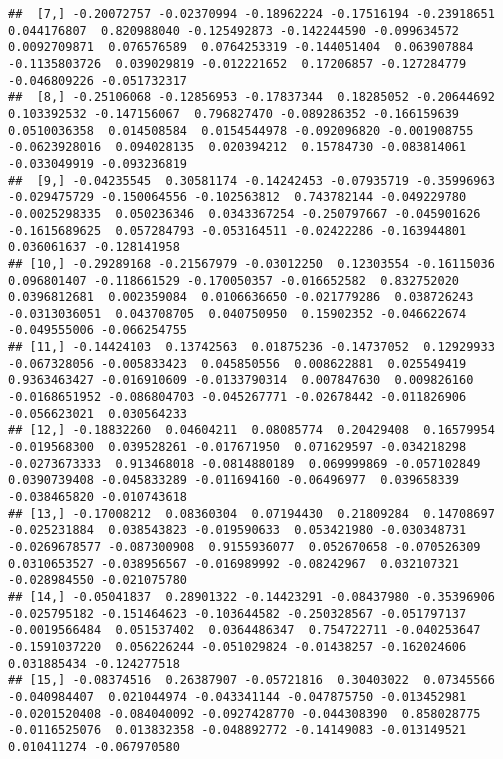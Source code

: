 \documentclass[
]{book}
\begin{document}
\begin{verbatim}
##  [7,] -0.20072757 -0.02370994 -0.18962224 -0.17516194 -0.23918651  0.044176807  0.820988040 -0.125492873 -0.142244590 -0.099634572  0.0092709871  0.076576589  0.0764253319 -0.144051404  0.063907884 -0.1135803726  0.039029819 -0.012221652  0.17206857 -0.127284779 -0.046809226 -0.051732317
##  [8,] -0.25106068 -0.12856953 -0.17837344  0.18285052 -0.20644692  0.103392532 -0.147156067  0.796827470 -0.089286352 -0.166159639  0.0510036358  0.014508584  0.0154544978 -0.092096820 -0.001908755 -0.0623928016  0.094028135  0.020394212  0.15784730 -0.083814061 -0.033049919 -0.093236819
##  [9,] -0.04235545  0.30581174 -0.14242453 -0.07935719 -0.35996963 -0.029475729 -0.150064556 -0.102563812  0.743782144 -0.049229780 -0.0025298335  0.050236346  0.0343367254 -0.250797667 -0.045901626 -0.1615689625  0.057284793 -0.053164511 -0.02422286 -0.163944801  0.036061637 -0.128141958
## [10,] -0.29289168 -0.21567979 -0.03012250  0.12303554 -0.16115036  0.096801407 -0.118661529 -0.170050357 -0.016652582  0.832752020  0.0396812681  0.002359084  0.0106636650 -0.021779286  0.038726243 -0.0313036051  0.043708705  0.040750950  0.15902352 -0.046622674 -0.049555006 -0.066254755
## [11,] -0.14424103  0.13742563  0.01875236 -0.14737052  0.12929933 -0.067328056 -0.005833423  0.045850556  0.008622881  0.025549419  0.9363463427 -0.016910609 -0.0133790314  0.007847630  0.009826160 -0.0168651952 -0.086804703 -0.045267771 -0.02678442 -0.011826906 -0.056623021  0.030564233
## [12,] -0.18832260  0.04604211  0.08085774  0.20429408  0.16579954 -0.019568300  0.039528261 -0.017671950  0.071629597 -0.034218298 -0.0273673333  0.913468018 -0.0814880189  0.069999869 -0.057102849  0.0390739408 -0.045833289 -0.011694160 -0.06496977  0.039658339 -0.038465820 -0.010743618
## [13,] -0.17008212  0.08360304  0.07194430  0.21809284  0.14708697 -0.025231884  0.038543823 -0.019590633  0.053421980 -0.030348731 -0.0269678577 -0.087300908  0.9155936077  0.052670658 -0.070526309  0.0310653527 -0.038956567 -0.016989992 -0.08242967  0.032107321 -0.028984550 -0.021075780
## [14,] -0.05041837  0.28901322 -0.14423291 -0.08437980 -0.35396906 -0.025795182 -0.151464623 -0.103644582 -0.250328567 -0.051797137 -0.0019566484  0.051537402  0.0364486347  0.754722711 -0.040253647 -0.1591037220  0.056226244 -0.051029824 -0.01438257 -0.162024606  0.031885434 -0.124277518
## [15,] -0.08374516  0.26387907 -0.05721816  0.30403022  0.07345566 -0.040984407  0.021044974 -0.043341144 -0.047875750 -0.013452981 -0.0201520408 -0.084040092 -0.0927428770 -0.044308390  0.858028775 -0.0116525076  0.013832358 -0.048892772 -0.14149083 -0.013149521  0.010411274 -0.067970580

\end{verbatim}
\end{document}
